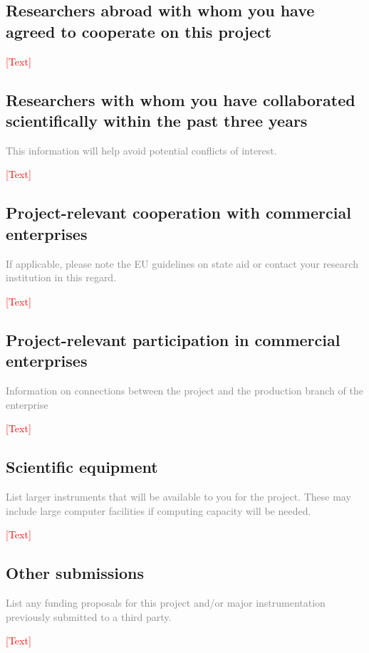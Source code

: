 \documentclass[a4paper,11pt]{article}
\begin{document}
\subsection{Researchers abroad with whom you have agreed to cooperate on this project}

\noindent\textcolor{red}{[Text]}

\subsection{Researchers with whom you have collaborated scientifically within the past three years}
\textcolor{gray}{This information will help avoid potential conflicts of interest.}

\noindent\textcolor{red}{[Text]}

\subsection{Project-relevant cooperation with commercial enterprises}
\textcolor{gray}{If applicable, please note the EU guidelines on state aid or contact your research institution in this regard.}

\noindent\textcolor{red}{[Text]}

\subsection{Project-relevant participation in commercial enterprises}
\textcolor{gray}{Information on connections between the project and the production branch of the enterprise}

\noindent\textcolor{red}{[Text]}

\subsection{Scientific equipment}
\textcolor{gray}{List larger instruments that will be available to you for the project. These may include large computer facilities if computing capacity will be needed. }

\noindent\textcolor{red}{[Text]}

\subsection{Other submissions}
\textcolor{gray}{List any funding proposals for this project and/or major instrumentation previously submitted to a third party.}

\noindent\textcolor{red}{[Text]}
\end{document}

